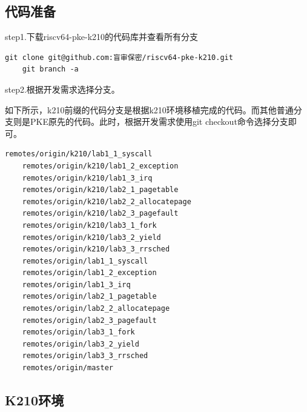 \subsection{代码准备}

step1.下载riscv64-pke-k210的代码库并查看所有分支

\begin{lstlisting}[caption={下载代码库}, label={lst:download_code}]
    git clone git@github.com:盲审保密/riscv64-pke-k210.git
    git branch -a
\end{lstlisting}

step2.根据开发需求选择分支。

如下所示，k210前缀的代码分支是根据k210环境移植完成的代码。而其他普通分支则是PKE原先的代码。此时，根据开发需求使用git checkout命令选择分支即可。

\begin{lstlisting}[caption={分支列表}, label={lst:branch_list}]
    remotes/origin/k210/lab1_1_syscall
    remotes/origin/k210/lab1_2_exception
    remotes/origin/k210/lab1_3_irq
    remotes/origin/k210/lab2_1_pagetable
    remotes/origin/k210/lab2_2_allocatepage
    remotes/origin/k210/lab2_3_pagefault
    remotes/origin/k210/lab3_1_fork
    remotes/origin/k210/lab3_2_yield
    remotes/origin/k210/lab3_3_rrsched
    remotes/origin/lab1_1_syscall
    remotes/origin/lab1_2_exception
    remotes/origin/lab1_3_irq
    remotes/origin/lab2_1_pagetable
    remotes/origin/lab2_2_allocatepage
    remotes/origin/lab2_3_pagefault
    remotes/origin/lab3_1_fork
    remotes/origin/lab3_2_yield
    remotes/origin/lab3_3_rrsched
    remotes/origin/master
\end{lstlisting}

\subsection{K210环境}

